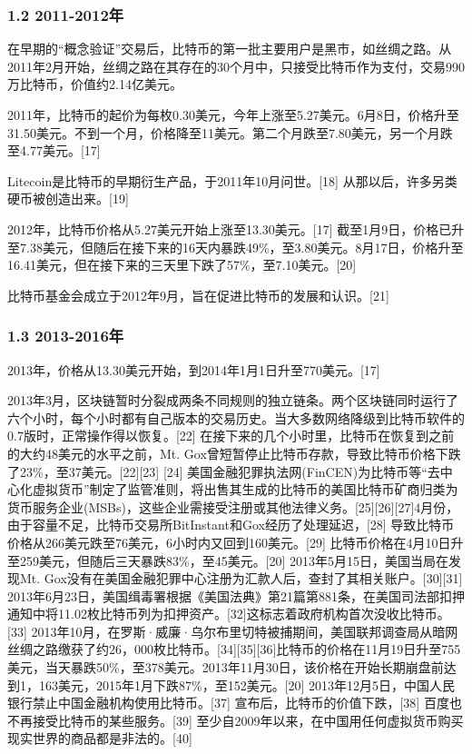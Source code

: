 \subsubsection{1.2 2011-2012年}
在早期的“概念验证”交易后，比特币的第一批主要用户是黑市，如丝绸之路。从2011年2月开始，丝绸之路在其存在的30个月中，只接受比特币作为支付，交易990万比特币，价值约2.14亿美元。

2011年，比特币的起价为每枚0.30美元，今年上涨至5.27美元。6月8日，价格升至31.50美元。不到一个月，价格降至11美元。第二个月跌至7.80美元，另一个月跌至4.77美元。[17]

Litecoin是比特币的早期衍生产品，于2011年10月问世。[18] 从那以后，许多另类硬币被创造出来。[19]

2012年，比特币价格从5.27美元开始上涨至13.30美元。[17] 截至1月9日，价格已升至7.38美元，但随后在接下来的16天内暴跌49\%，至3.80美元。8月17日，价格升至16.41美元，但在接下来的三天里下跌了57\%，至7.10美元。[20]

比特币基金会成立于2012年9月，旨在促进比特币的发展和认识。[21]
\subsubsection{1.3 2013-2016年}
2013年，价格从13.30美元开始，到2014年1月1日升至770美元。[17]

2013年3月，区块链暂时分裂成两条不同规则的独立链条。两个区块链同时运行了六个小时，每个小时都有自己版本的交易历史。当大多数网络降级到比特币软件的0.7版时，正常操作得以恢复。[22] 在接下来的几个小时里，比特币在恢复到之前的大约48美元的水平之前，Mt. Gox曾短暂停止比特币存款，导致比特币价格下跌了23\%，至37美元。[22][23] [24] 美国金融犯罪执法网(FinCEN)为比特币等“去中心化虚拟货币”制定了监管准则，将出售其生成的比特币的美国比特币矿商归类为货币服务企业(MSBs)，这些企业需接受注册或其他法律义务。[25][26][27]4月份，由于容量不足，比特币交易所BitInstant和Gox经历了处理延迟，[28] 导致比特币价格从266美元跌至76美元，6小时内又回到160美元。[29] 比特币价格在4月10日升至259美元，但随后三天暴跌83\%，至45美元。[20] 2013年5月15日，美国当局在发现Mt. Gox没有在美国金融犯罪中心注册为汇款人后，查封了其相关账户。[30][31] 2013年6月23日，美国缉毒署根据《美国法典》第21篇第881条，在美国司法部扣押通知中将11.02枚比特币列为扣押资产。[32]这标志着政府机构首次没收比特币。[33] 2013年10月，在罗斯·威廉·乌尔布里切特被捕期间，美国联邦调查局从暗网丝绸之路缴获了约26，000枚比特币。[34][35][36]比特币的价格在11月19日升至755美元，当天暴跌50\%，至378美元。2013年11月30日，该价格在开始长期崩盘前达到1，163美元，2015年1月下跌87\%，至152美元。[20] 2013年12月5日，中国人民银行禁止中国金融机构使用比特币。[37] 宣布后，比特币的价值下跌，[38] 百度也不再接受比特币的某些服务。[39] 至少自2009年以来，在中国用任何虚拟货币购买现实世界的商品都是非法的。[40]

